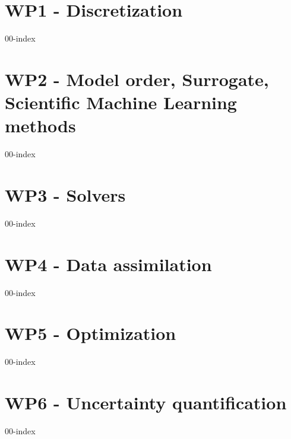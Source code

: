 \chapter{WP1 - Discretization}
\label{chap:wp1}
\clearpage
{00-index}

\chapter{WP2 - Model order, Surrogate, Scientific Machine Learning methods}
\label{chap:wp2}
\clearpage
{00-index}

\chapter{WP3 - Solvers}
\label{chap:wp3}
\clearpage
{00-index}

\chapter{WP4 - Data assimilation}
\label{chap:wp4}
\clearpage
{00-index}

\chapter{WP5 - Optimization}
\label{chap:wp5}
\clearpage
{00-index}

\chapter{WP6 - Uncertainty quantification}
\label{chap:wp6}
\clearpage
{00-index}

